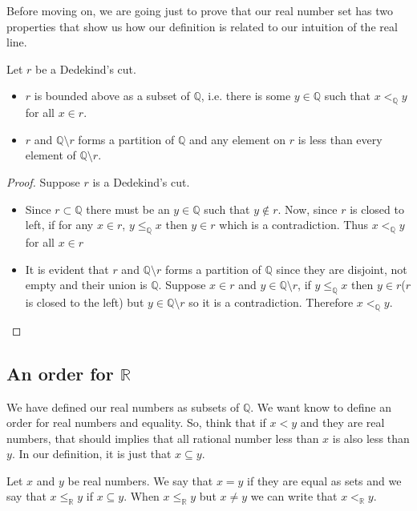 \documentclass{tufte-handout}
\begin{document}
Before moving on, we are going just to prove that our real number set has two properties that show us how our definition is related to our intuition of the real line.
\begin{problem}
	Let $r$ be a Dedekind's cut.
	\begin{itemize}
		\item $r$ is bounded above as a subset of $\mathbb{Q}$, i.e. there is some $y \in \mathbb{Q}$ such that $x <_\mathbb{Q} y$ for all $x \in r$.
		\item $r$ and $\mathbb{Q} \setminus r$ forms a partition of $\mathbb{Q}$ and any element on $r$ is less than every element of $\mathbb{Q} \setminus r$.
	\end{itemize}
\end{problem}
\begin{proof}
	Suppose $r$ is a Dedekind's cut.
	\begin{itemize}
		\item Since $r \subset \mathbb{Q}$ there must be an $y \in \mathbb{Q}$ such that $y \not\in r$. Now, since $r$ is closed to left, if for any $x \in r$, $y \le_\mathbb{Q} x$ then $y \in r$ which is a contradiction. Thus $x <_\mathbb{Q} y$ for all $x \in r$
		\item It is evident that $r$ and $\mathbb{Q} \setminus r$ forms a partition of $\mathbb{Q}$ since they are disjoint, not empty and their union is $\mathbb{Q}$. Suppose $x \in r$ and $y \in \mathbb{Q} \setminus r$, if $y \le_\mathbb{Q} x$ then $y \in r$($r$ is closed to the left) but $y \in \mathbb{Q} \setminus r$ so it is a contradiction. Therefore $x <_\mathbb{Q} y$.
	\end{itemize}
\end{proof}

\subsection{An order for $\mathbb{R}$}
We have defined our real numbers as subsets of $\mathbb{Q}$. We want know to define an order for real numbers and equality. So, think that if $x < y$ and they are real numbers, that should implies that all rational number less than $x$ is also less than $y$. In our definition, it is just that $x \subseteq y$.
\begin{definition}
	Let $x$ and $y$ be real numbers. We say that $x = y$ if they are equal as sets and we say that $x \le_\mathbb{R} y$ if $x \subseteq y$. When $x \le_\mathbb{R} y$ but $x \neq y$ we can write that $x <_\mathbb{R} y$.
\end{definition}
\end{document}
